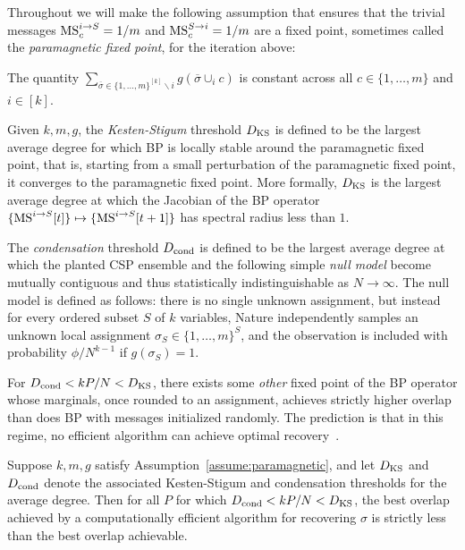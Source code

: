 Throughout we will make the following assumption that ensures that the trivial messages $\textrm{MS}^{i\to S}_c = 1/m$ and $\textrm{MS}^{S\to i}_c = 1/m$ are a fixed point, sometimes called the \emph{paramagnetic fixed point}, for the iteration above:

\begin{assumption}\label{assume:paramagnetic}
    The quantity $\sum_{\overline{\sigma}\in \{1,\ldots,m\}^{[k]}\backslash i} g(\overline{\sigma}\cup_i c)$ is constant across all $c\in \{1,\ldots,m\} $ and $i\in[k]$.
\end{assumption}

\begin{definition}\label{def:thresholds}
    Given $k,m,g$, the \emph{Kesten-Stigum} threshold $D_{\rm KS}$ is defined to be the largest average degree for which BP is locally stable around the paramagnetic fixed point, that is, starting from a small perturbation of the paramagnetic fixed point, it converges to the paramagnetic fixed point. More formally, $D_{\rm KS}$ is the largest average degree at which the Jacobian of the BP operator $\{\textrm{MS}^{i\to S}[t]\}\mapsto \{\textrm{MS}^{i\to S}[t+1]\}$ has spectral radius less than $1$.

    The \emph{condensation} threshold $D_{\rm cond}$ is defined to be the largest average degree at which the planted CSP ensemble and the following simple \emph{null model} become mutually contiguous and thus statistically indistinguishable as $N \to \infty$. The null model is defined as follows: there is no single unknown assignment, but instead for every ordered subset $S$ of $k$ variables, Nature independently samples an unknown local assignment $\sigma_S \in \{1,\ldots,m\}^S$, and the observation is included with probability $\phi / N^{k-1}$ if $g(\sigma_S) = 1$. 
\end{definition}

For $D_{\rm cond} < kP/N < D_{\rm KS}$, there exists some \emph{other} fixed point of the BP operator whose marginals, once rounded to an assignment, achieves strictly higher overlap than does BP with messages initialized randomly. The prediction is that in this regime, no efficient algorithm can achieve optimal recovery~\cite{krzakala2009hiding}.

\begin{conjecture}\label{conj:1rsb}
    Suppose $k, m, g$ satisfy Assumption~\ref{assume:paramagnetic}, and let $D_{\rm KS}$ and $D_{\rm cond}$ denote the associated Kesten-Stigum and condensation thresholds for the average degree. Then for all $P$ for which $D_{\rm cond} < kP/N < D_{\rm KS}$, the best overlap achieved by a computationally efficient algorithm for recovering $\sigma$ is strictly less than the best overlap achievable.
\end{conjecture}


